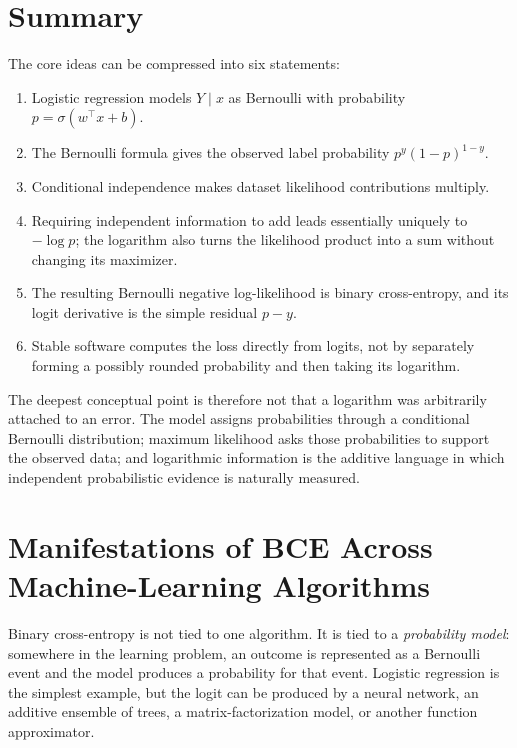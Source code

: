 \documentclass[11pt]{article}
\newcommand{\sigmoid}{\sigma}
\theoremstyle{definition}
\begin{document}
\section{Summary}

The core ideas can be compressed into six statements:
\begin{enumerate}
  \item Logistic regression models $Y\mid x$ as Bernoulli with probability $p=\sigmoid(w^\top x+b)$.
  \item The Bernoulli formula gives the observed label probability $p^y(1-p)^{1-y}$.
  \item Conditional independence makes dataset likelihood contributions multiply.
  \item Requiring independent information to add leads essentially uniquely to $-\log p$; the logarithm also turns the likelihood product into a sum without changing its maximizer.
  \item The resulting Bernoulli negative log-likelihood is binary cross-entropy, and its logit derivative is the simple residual $p-y$.
  \item Stable software computes the loss directly from logits, not by separately forming a possibly rounded probability and then taking its logarithm.
\end{enumerate}

The deepest conceptual point is therefore not that a logarithm was arbitrarily attached to an error. The model assigns probabilities through a conditional Bernoulli distribution; maximum likelihood asks those probabilities to support the observed data; and logarithmic information is the additive language in which independent probabilistic evidence is naturally measured.

\clearpage
\appendix

\section{Manifestations of BCE Across Machine-Learning Algorithms}
\label{app:bce-manifestations}

Binary cross-entropy is not tied to one algorithm. It is tied to a \emph{probability model}: somewhere in the learning problem, an outcome is represented as a Bernoulli event and the model produces a probability for that event. Logistic regression is the simplest example, but the logit can be produced by a neural network, an additive ensemble of trees, a matrix-factorization model, or another function approximator.
\end{document}
